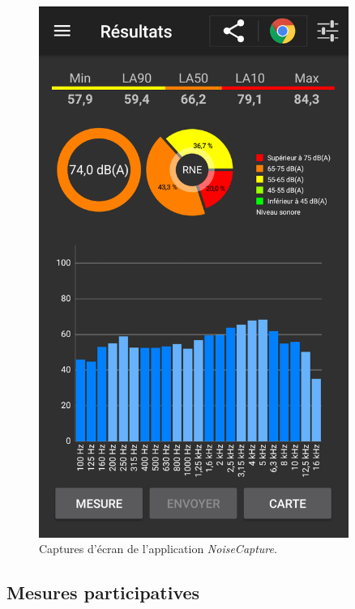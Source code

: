 \begin{figure}[t]
\begin{center}
\begin{minipage}[t]{0.3\textwidth}
        \includegraphics[width=0.9\textwidth]{./figures/autres/noiseCapture2.png}
    \end{minipage}
    \caption{Captures d'écran de l'application \textit{NoiseCapture}.}
    \label{fig:noiseCaptureScreen}
\end{center}
\end{figure}

\subsection{Mesures participatives}\label{part:mesures_participatives}

